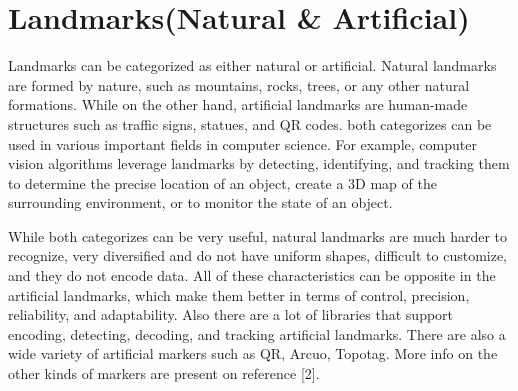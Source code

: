\section{Landmarks(Natural \& Artificial)}

Landmarks can be categorized as either natural or artificial. Natural landmarks
are formed by nature, such as mountains, rocks, trees, or any other natural
formations. While on the other hand, artificial landmarks are human-made
structures such as traffic signs, statues, and QR codes. both categorizes can be used in various important fields in computer science. For example, computer vision algorithms leverage landmarks by detecting, identifying, and tracking them to determine the precise location of an object, create a 3D map of the surrounding environment, or to monitor the state of an object.

While both categorizes can be very useful, natural landmarks are much harder to recognize, very diversified and do not have uniform shapes, difficult to customize, and they do not encode data. All of these characteristics can be opposite in the artificial landmarks, which make them better in terms of control, precision, reliability, and adaptability. Also there are a lot of libraries that support encoding, detecting, decoding, and tracking artificial landmarks. There are also a wide variety of artificial markers such as QR, Arcuo, Topotag. 
More info on the other kinds of markers are present on reference [2].

	
